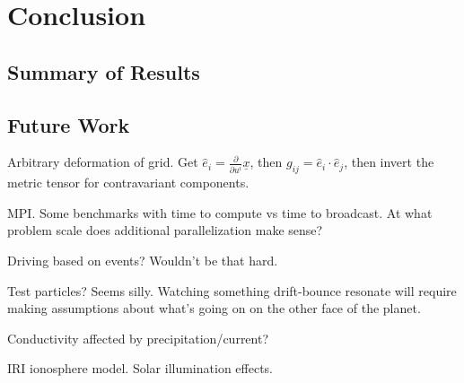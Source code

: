 


\chapter{Conclusion}
  \label{ch_conclusion}


\section{Summary of Results}



\section{Future Work}

Arbitrary deformation of grid. Get $\hat{e}_i = \frac{\partial}{\partial u^i} \underline{x}$, then $g_{ij} = \hat{e}_i \cdot \hat{e}_j$, then invert the metric tensor for contravariant components.  

MPI. Some benchmarks with time to compute vs time to broadcast. At what problem scale does additional parallelization make sense? 

Driving based on events? Wouldn't be that hard. 

Test particles? Seems silly. Watching something drift-bounce resonate will require making assumptions about what's going on on the other face of the planet.  

Conductivity affected by precipitation/current? 

IRI ionosphere model. Solar illumination effects. 
